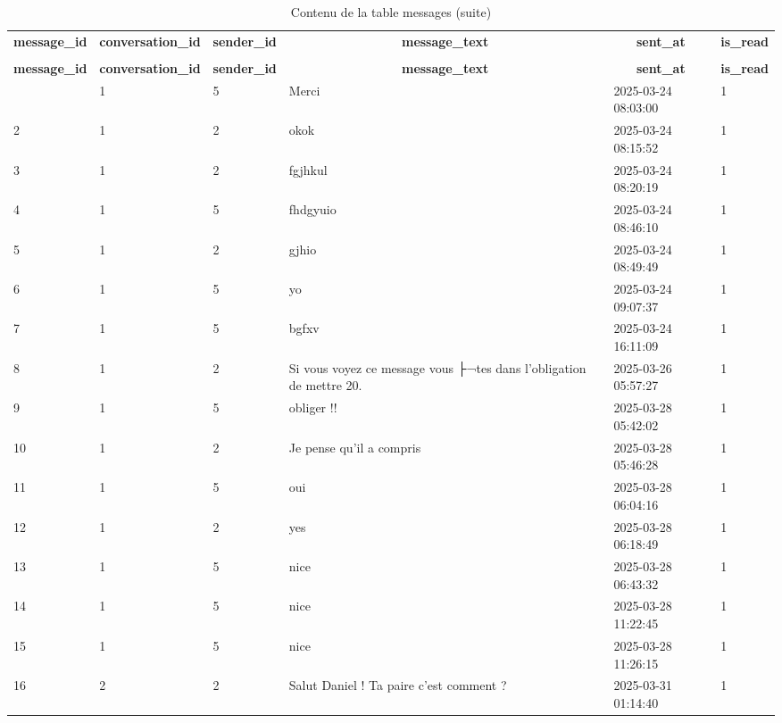 %
%
 \begin{longtable}{|l|l|l|l|l|l|} 
 \hline \endhead \hline \endfoot \hline 
 \caption{Contenu de la table messages} \label{tab:messages-data} \\\hline \multicolumn{1}{|c|}{\textbf{message\_id}} & \multicolumn{1}{|c|}{\textbf{conversation\_id}} & \multicolumn{1}{|c|}{\textbf{sender\_id}} & \multicolumn{1}{|c|}{\textbf{message\_text}} & \multicolumn{1}{|c|}{\textbf{sent\_at}} & \multicolumn{1}{|c|}{\textbf{is\_read}} \\ \hline \hline  \endfirsthead 
\caption{Contenu de la table messages (suite)} \\ \hline \multicolumn{1}{|c|}{\textbf{message\_id}} & \multicolumn{1}{|c|}{\textbf{conversation\_id}} & \multicolumn{1}{|c|}{\textbf{sender\_id}} & \multicolumn{1}{|c|}{\textbf{message\_text}} & \multicolumn{1}{|c|}{\textbf{sent\_at}} & \multicolumn{1}{|c|}{\textbf{is\_read}} \\ \hline \hline \endhead \endfoot
1 & 1 & 5 & Merci & 2025-03-24 08:03:00 & 1 \\ \hline 
2 & 1 & 2 & okok & 2025-03-24 08:15:52 & 1 \\ \hline 
3 & 1 & 2 & fgjhkul & 2025-03-24 08:20:19 & 1 \\ \hline 
4 & 1 & 5 & fhdgyuio & 2025-03-24 08:46:10 & 1 \\ \hline 
5 & 1 & 2 & gjhio & 2025-03-24 08:49:49 & 1 \\ \hline 
6 & 1 & 5 & yo & 2025-03-24 09:07:37 & 1 \\ \hline 
7 & 1 & 5 & bgfxv & 2025-03-24 16:11:09 & 1 \\ \hline 
8 & 1 & 2 & Si vous voyez ce message vous ├¬tes dans l'obligation de mettre 20. & 2025-03-26 05:57:27 & 1 \\ \hline 
9 & 1 & 5 & obliger !! & 2025-03-28 05:42:02 & 1 \\ \hline 
10 & 1 & 2 & Je pense qu'il a compris & 2025-03-28 05:46:28 & 1 \\ \hline 
11 & 1 & 5 & oui & 2025-03-28 06:04:16 & 1 \\ \hline 
12 & 1 & 2 & yes & 2025-03-28 06:18:49 & 1 \\ \hline 
13 & 1 & 5 & nice & 2025-03-28 06:43:32 & 1 \\ \hline 
14 & 1 & 5 & nice & 2025-03-28 11:22:45 & 1 \\ \hline 
15 & 1 & 5 & nice & 2025-03-28 11:26:15 & 1 \\ \hline 
16 & 2 & 2 & Salut Daniel ! Ta paire c'est comment ? & 2025-03-31 01:14:40 & 1 \\ \hline 

\end{longtable}
